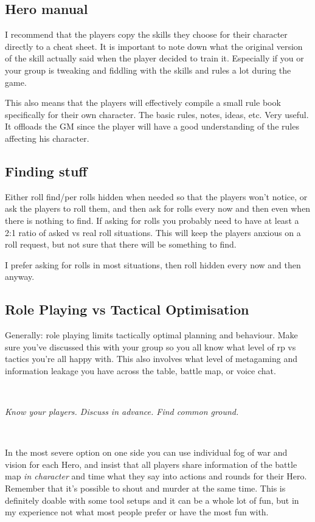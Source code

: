 \subsection*{Hero manual}
I recommend that the players copy the skills they choose for their character directly to a cheat sheet. It is important to note down what the original version of the skill actually said when the player decided to train it. Especially if you or your group is tweaking and fiddling with the skills and rules a lot during the game.

This also means that the players will effectively compile a small rule book specifically for their own character. The basic rules, notes, ideas, etc. Very useful. It offloads the GM since the player will have a good understanding of the rules affecting his character.


\subsection*{Finding stuff}
Either roll find/per rolls hidden when needed so that the players won't notice, or ask the players to roll them, and then ask for rolls every now and then even when there is nothing to find. If asking for rolls you probably need to have at least a 2:1 ratio of asked vs real roll situations. This will keep the players anxious on a roll request, but not sure that there will be something to find.

I prefer asking for rolls in most situations, then roll hidden every now and then anyway.


\subsection*{Role Playing vs Tactical Optimisation}
Generally: role playing limits tactically optimal planning and behaviour. Make sure you've discussed this with your group so you all know what level of rp vs tactics you're all happy with. This also involves what level of metagaming and information leakage you have across the table, battle map, or voice chat.

\

\noindent \emph{Know your players. Discuss in advance. Find common ground.}

\

\noindent
In the most severe option on one side you can use individual fog of war and vision for each Hero, and insist that all players share information of the battle map \emph{in character} and time what they say into actions and rounds for their Hero. Remember that it's possible to shout and murder at the same time. This is definitely doable with some tool setups and it can be a whole lot of fun, but in my experience not what most people prefer or have the most fun with.

